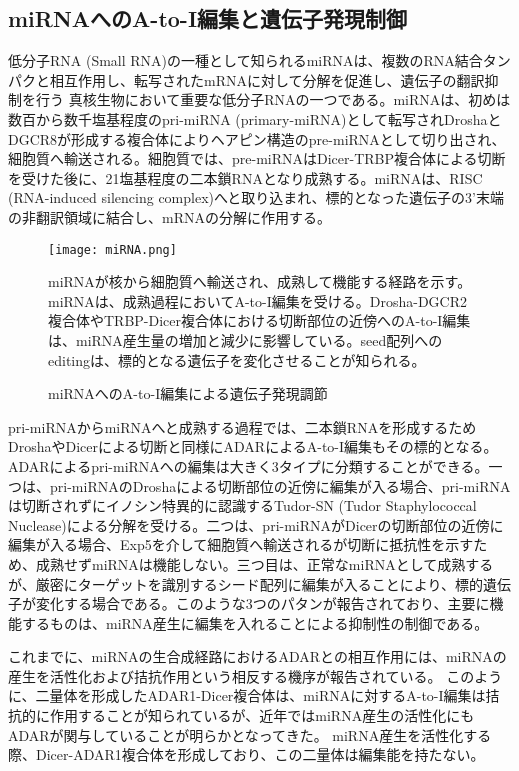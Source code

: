 \subsection{miRNAへのA-to-I編集と遺伝子発現制御}
低分子RNA (Small RNA)の一種として知られるmiRNAは、複数のRNA結合タンパクと相互作用し、転写されたmRNAに対して分解を促進し、遺伝子の翻訳抑制を行う
真核生物において重要な低分子RNAの一つである。miRNAは、初めは数百から数千塩基程度のpri-miRNA (primary-miRNA)として転写されDroshaとDGCR8が形成する複合体によりヘアピン構造のpre-miRNAとして切り出され、細胞質へ輸送される。細胞質では、pre-miRNAはDicer-TRBP複合体による切断を受けた後に、21塩基程度の二本鎖RNAとなり成熟する。miRNAは、RISC (RNA-induced silencing complex)へと取り込まれ、標的となった遺伝子の3'末端の非翻訳領域に結合し、mRNAの分解に作用する。

\begin{figure}[!h]
	\begin{center}
		\texttt{[image: miRNA.png]}
	\end{center}
	\caption{miRNAへのA-to-I編集による遺伝子発現調節}
	\begin{flushleft}
		\small{miRNAが核から細胞質へ輸送され、成熟して機能する経路を示す。miRNAは、成熟過程においてA-to-I編集を受ける。Drosha-DGCR2複合体やTRBP-Dicer複合体における切断部位の近傍へのA-to-I編集は、miRNA産生量の増加と減少に影響している。seed配列へのeditingは、標的となる遺伝子を変化させることが知られる。}
	\end{flushleft}
	\label{fig:miRNA}
\end{figure}
pri-miRNAからmiRNAへと成熟する過程では、二本鎖RNAを形成するためDroshaやDicerによる切断と同様にADARによるA-to-I編集もその標的となる。ADARによるpri-miRNAへの編集は大きく3タイプに分類することができる。一つは、pri-miRNAのDroshaによる切断部位の近傍に編集が入る場合、pri-miRNAは切断されずにイノシン特異的に認識するTudor-SN (Tudor Staphylococcal
Nuclease)による分解を受ける。二つは、pri-miRNAがDicerの切断部位の近傍に編集が入る場合、Exp5を介して細胞質へ輸送されるが切断に抵抗性を示すため、成熟せずmiRNAは機能しない。三つ目は、正常なmiRNAとして成熟するが、厳密にターゲットを識別するシード配列に編集が入ることにより、標的遺伝子が変化する場合である。このような3つのパタンが報告されており、主要に機能するものは、miRNA産生に編集を入れることによる抑制性の制御である。
\par
これまでに、miRNAの生合成経路におけるADARとの相互作用には、miRNAの産生を活性化および拮抗作用という相反する機序が報告されている。
このように、二量体を形成したADAR1-Dicer複合体は、miRNAに対するA-to-I編集は拮抗的に作用することが知られているが、近年ではmiRNA産生の活性化にもADARが関与していることが明らかとなってきた。
miRNA産生を活性化する際、Dicer-ADAR1複合体を形成しており、この二量体は編集能を持たない。

